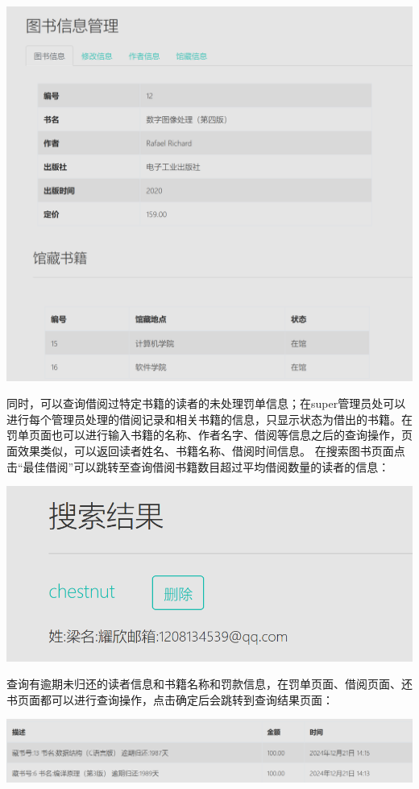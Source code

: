 \documentclass[a4paper,14pt]{article}
\begin{document}
\begin{center}
    \includegraphics[width=0.7\linewidth]{images/chaxun3.png}\end{center}
\vspace{5pt}

同时，可以查询借阅过特定书籍的读者的未处理罚单信息；在super管理员处可以进行每个管理员处理的借阅记录和相关书籍的信息，只显示状态为借出的书籍。在罚单页面也可以进行输入书籍的名称、作者名字、借阅等信息之后的查询操作，页面效果类似，可以返回读者姓名、书籍名称、借阅时间信息。
在搜索图书页面点击“最佳借阅”可以跳转至查询借阅书籍数目超过平均借阅数量的读者的信息：

\vspace{10pt}
\begin{center}
    \includegraphics[width=0.4\linewidth]{images/222.png}\end{center}
\vspace{5pt}

查询有逾期未归还的读者信息和书籍名称和罚款信息，在罚单页面、借阅页面、还书页面都可以进行查询操作，点击确定后会跳转到查询结果页面：

\vspace{10pt}
\begin{center}
    \includegraphics[width=0.7\linewidth]{images/111.png}\end{center}
\vspace{5pt}
\end{document}
